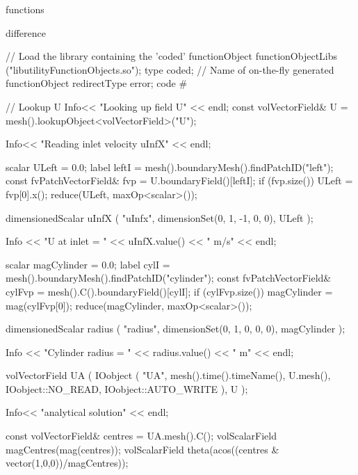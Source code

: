 \begin{OFverbatim}
functions
{
    difference
    {
        // Load the library containing the 'coded' functionObject
        functionObjectLibs ("libutilityFunctionObjects.so");
        type coded;
        // Name of on-the-fly generated functionObject
        redirectType error;
        code
        #{
            // Lookup U
            Info<< "Looking up field U\n" << endl;
            const volVectorField& U = mesh().lookupObject<volVectorField>("U");

            Info<< "Reading inlet velocity  uInfX\n" << endl;

            scalar ULeft = 0.0;
            label leftI = mesh().boundaryMesh().findPatchID("left");
            const fvPatchVectorField& fvp = U.boundaryField()[leftI];
            if (fvp.size())
            {
                ULeft = fvp[0].x();
            }
            reduce(ULeft, maxOp<scalar>());

            dimensionedScalar uInfX
            (
                "uInfx",
                dimensionSet(0, 1, -1, 0, 0),
                ULeft
            );

            Info << "U at inlet = " << uInfX.value() << " m/s" << endl;


            scalar magCylinder = 0.0;
            label cylI = mesh().boundaryMesh().findPatchID("cylinder");
            const fvPatchVectorField& cylFvp = mesh().C().boundaryField()[cylI];
            if (cylFvp.size())
            {
                magCylinder = mag(cylFvp[0]);
            }
            reduce(magCylinder, maxOp<scalar>());

            dimensionedScalar radius
            (
                "radius",
                dimensionSet(0, 1, 0, 0, 0),
                magCylinder
            );

            Info << "Cylinder radius = " << radius.value() << " m" << endl;

            volVectorField UA
            (
                IOobject
                (
                    "UA",
                    mesh().time().timeName(),
                    U.mesh(),
                    IOobject::NO_READ,
                    IOobject::AUTO_WRITE
                ),
                U
            );

            Info<< "\nEvaluating analytical solution" << endl;

            const volVectorField& centres = UA.mesh().C();
            volScalarField magCentres(mag(centres));
            volScalarField theta(acos((centres & vector(1,0,0))/magCentres));

}}}
\end{OFverbatim}
